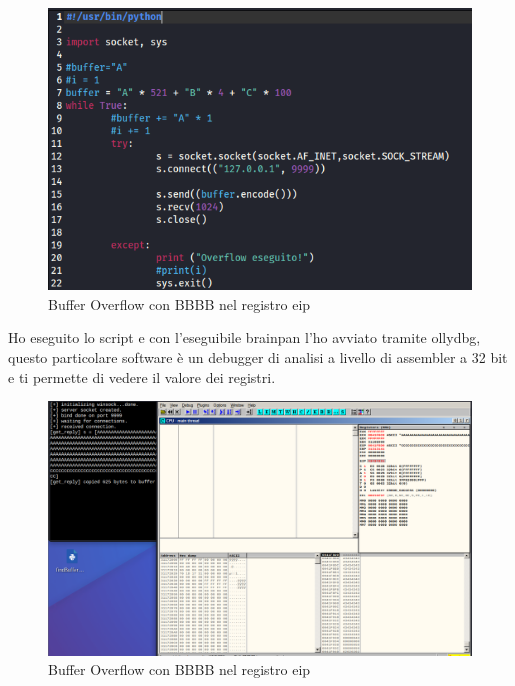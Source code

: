 \documentclass[12pt,letterpaper]{article} %
\begin{document}
\begin{figure}[h!]
  \centering
  \includegraphics[width=\textwidth]{python2.png}
  \caption{Buffer Overflow con BBBB nel registro eip}
  \label{fig:p2}
\end{figure}

\noindent Ho eseguito lo script e con l'eseguibile brainpan l'ho avviato tramite ollydbg, questo particolare software è un debugger di analisi a livello di assembler a 32 bit e ti permette di vedere il valore dei registri. 

\begin{figure}[h!]
  \centering
  \includegraphics[width=\textwidth]{ollydbg1.png}
  \caption{Buffer Overflow con BBBB nel registro eip}
  \label{fig:olly1}
\end{figure}
\end{document}
